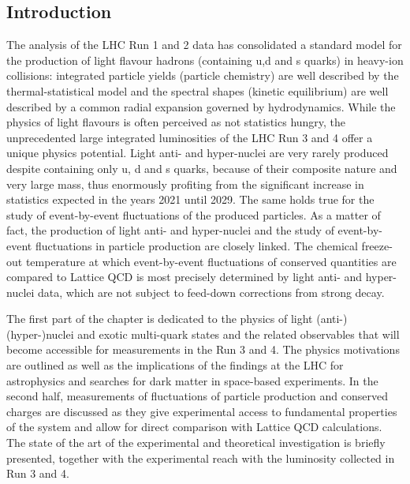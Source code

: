 \subsection{Introduction}
The analysis of the LHC Run 1 and 2 data has consolidated a standard model for the production of light flavour hadrons (containing u,d and s quarks) in heavy-ion collisions:
integrated particle yields (particle chemistry) are well described by the thermal-statistical model and  
the spectral shapes (kinetic equilibrium) are well described by a common radial expansion governed by hydrodynamics.
While the physics of light flavours is often perceived as not statistics hungry, the unprecedented large integrated luminosities of the LHC Run 3 and 4 offer a unique physics potential. Light anti- and hyper-nuclei are very rarely produced despite containing only u, d and s quarks, because of their composite nature and very large mass, thus enormously profiting from the significant increase in statistics expected in the years 2021 until 2029. 
The same holds true for the study of event-by-event fluctuations of the produced particles.
As a matter of fact, the production of light anti- and hyper-nuclei and the study of event-by-event fluctuations in particle production are closely linked. 
The chemical freeze-out temperature at which event-by-event fluctuations of conserved quantities are compared to Lattice QCD is most precisely determined by light anti- and hyper-nuclei data, which are not subject to feed-down corrections from strong decay.

The first part of the chapter is dedicated to the physics of light (anti-)(hyper-)nuclei and exotic multi-quark states and the related observables that will become accessible for measurements in the Run 3 and 4. 
The physics motivations are outlined as well as the implications of the findings at the LHC for astrophysics and searches for dark matter in space-based experiments.
In the second half, measurements of fluctuations of particle production and conserved charges are discussed as they give experimental access to fundamental properties of the system and allow for direct comparison with Lattice QCD calculations. 
The state of the art of the experimental and theoretical investigation is briefly presented, together with the experimental reach  with the luminosity collected in Run 3 and 4.

